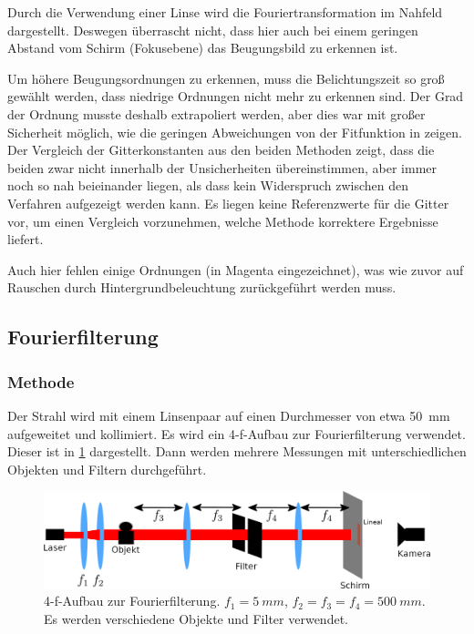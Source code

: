 \documentclass[
	a4paper,
	12pt,
	pagesize,
	ngerman
]{scrartcl}
\begin{document}
Durch die Verwendung einer Linse wird die Fouriertransformation im Nahfeld dargestellt. %
Deswegen überrascht nicht, dass hier auch bei einem geringen Abstand vom Schirm (Fokusebene) das Beugungsbild zu erkennen ist.

Um höhere Beugungsordnungen zu erkennen, muss die Belichtungszeit so groß gewählt werden, dass niedrige Ordnungen nicht mehr zu erkennen sind.
Der Grad der Ordnung musste deshalb extrapoliert werden, aber dies war mit großer Sicherheit möglich, wie die geringen Abweichungen von der Fitfunktion in  zeigen.
Der Vergleich der Gitterkonstanten aus den beiden Methoden zeigt, dass die beiden zwar nicht innerhalb der Unsicherheiten übereinstimmen, aber immer noch so nah beieinander liegen, als dass kein Widerspruch zwischen den Verfahren aufgezeigt werden kann.
Es liegen keine Referenzwerte für die Gitter vor, um einen Vergleich vorzunehmen, welche Methode korrektere Ergebnisse liefert.

Auch hier fehlen einige Ordnungen (in Magenta eingezeichnet), was wie zuvor auf Rauschen durch Hintergrundbeleuchtung zurückgeführt werden muss.

	\subsection{Fourierfilterung}

	\subsubsection*{Methode}

		Der Strahl wird mit einem Linsenpaar auf einen Durchmesser von etwa \SI{50}{mm} aufgeweitet und kollimiert.
		Es wird ein 4-f-Aufbau zur Fourierfilterung verwendet.
		Dieser ist in \cref{fig_4f} dargestellt.
		Dann werden mehrere Messungen mit unterschiedlichen Objekten und Filtern durchgeführt.

	\begin{figure}[H]
			\includegraphics[width=1\linewidth]{img/4f}
			\caption{
				4-f-Aufbau zur Fourierfilterung. $f_1= \SI{5}{mm}$, $f_2 = f_3 = f_4 = \SI{500}{mm}$. Es werden verschiedene Objekte und Filter verwendet.
			}
			\label{fig_4f}
	\end{figure}
\end{document}
